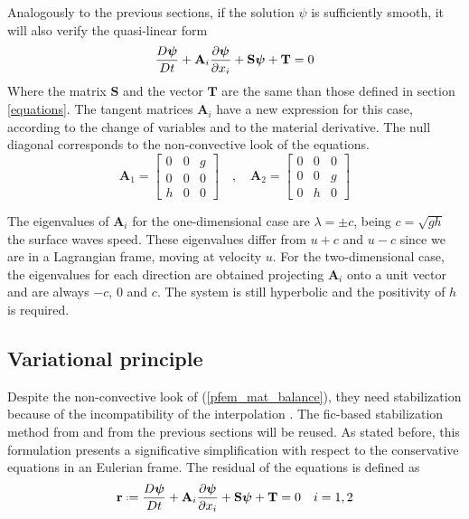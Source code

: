 Analogously to the previous sections, if the solution $\psi$ is sufficiently smooth, it will also verify the quasi-linear form
\begin{equation} \label{pfem_mat_balance_lin}
    \frac{D\bm{\psi}}{Dt} + \mathbf{A}_i\frac{\partial\bm{\psi}}{\partial x_i} + \mathbf{S}\bm{\psi} + \mathbf{T} = 0
\end{equation}
Where the matrix $\mathbf{S}$ and the vector $\mathbf{T}$ are the same than those defined in section \ref{equations}. The tangent matrices $\mathbf{A}_i$ have a new expression for this case, according to the change of variables and to the material derivative. The null diagonal corresponds to the non-convective look of the equations.
\begin{equation}
    \mathbf{A}_1 = \left[\begin{array}{ccc}
        0 & 0 & g \\
        0 & 0 & 0 \\
        h & 0 & 0
    \end{array}\right] \quad , \quad
    \mathbf{A}_2 = \left[\begin{array}{ccc}
        0 & 0 & 0 \\
        0 & 0 & g \\
        0 & h & 0
    \end{array}\right]
\end{equation}


The eigenvalues of $\mathbf{A}_i$ for the one-dimensional case are $\lambda = \pm c$, being $c=\sqrt{gh}$ the surface waves speed. These eigenvalues differ from $u+c$ and $u-c$ since we are in a Lagrangian frame, moving at velocity $u$.
For the two-dimensional case, the eigenvalues for each direction are obtained projecting $\mathbf{A}_i$ onto a unit vector and are always $-c$, $0$ and $c$.
The system is still hyperbolic and the positivity of $h$ is required. 




\subsection{Variational principle}


Despite the non-convective look of (\ref{pfem_mat_balance}), they need stabilization because of the incompatibility of the interpolation \cite{codina2008}. The fic-based stabilization method from \cite{onate1998} and from the previous sections will be reused. As stated before, this formulation presents a significative simplification with respect to the conservative equations in an Eulerian frame. The residual of the equations is defined as
\begin{equation}
    \mathbf{r} \defeq \frac{D\bm{\psi}}{Dt} + \mathbf{A}_i\pder{\bm{\psi}}{x_i} + \mathbf{S}\bm{\psi} + \mathbf{T} = 0 \quad i = 1,2
\end{equation}

